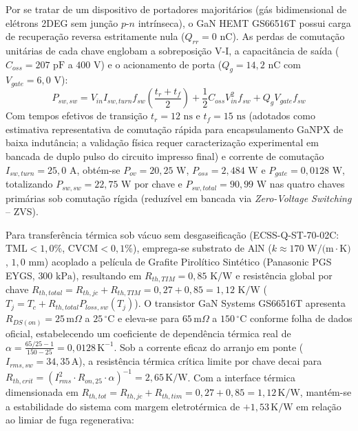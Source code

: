Por se tratar de um dispositivo de portadores majoritários (gás bidimensional de elétrons 2DEG sem junção $p\text{-}n$ intrínseca), o GaN HEMT GS66516T possui carga de recuperação reversa estritamente nula ($Q_{rr} = 0\text{ nC}$). As perdas de comutação unitárias de cada chave englobam a sobreposição V-I, a capacitância de saída ($C_{oss} = 207\text{ pF}$ a $400\text{ V}$) e o acionamento de porta ($Q_g = 14{,}2\text{ nC}$ com $V_{gate} = 6{,}0\text{ V}$):
\begin{equation}
    P_{sw,sw} = V_{in} I_{sw,turn} f_{sw} \left( \frac{t_r + t_f}{2} \right) + \frac{1}{2} C_{oss} V_{in}^2 f_{sw} + Q_g V_{gate} f_{sw}
    \label{eq:psw_sw}
\end{equation}
Com tempos efetivos de transição $t_r = 12\text{ ns}$ e $t_f = 15\text{ ns}$ (adotados como estimativa representativa de comutação rápida para encapsulamento GaNPX de baixa indutância; a validação física requer caracterização experimental em bancada de duplo pulso do circuito impresso final) e corrente de comutação $I_{sw,turn} = 25{,}0\text{ A}$, obtém-se $P_{ov} = 20{,}25\text{ W}$, $P_{oss} = 2{,}484\text{ W}$ e $P_{gate} = 0{,}0128\text{ W}$, totalizando $P_{sw,sw} = 22{,}75\text{ W}$ por chave e $P_{sw,total} = 90{,}99\text{ W}$ nas quatro chaves primárias sob comutação rígida (reduzível em bancada via \textit{Zero-Voltage Switching} -- ZVS).

Para transferência térmica sob vácuo sem desgaseificação (ECSS-Q-ST-70-02C: $\text{TML} < 1{,}0\%$, $\text{CVCM} < 0{,}1\%$), emprega-se substrato de $\text{AlN}$ ($k \approx 170\text{ W/(m}\cdot\text{K)}$, $1{,}0\text{ mm}$) acoplado a película de Grafite Pirolítico Sintético (Panasonic PGS EYGS, $300\text{ kPa}$), resultando em $R_{th,TIM} = 0{,}85\text{ K/W}$ e resistência global por chave $R_{th,total} = R_{th,jc} + R_{th,TIM} = 0{,}27 + 0{,}85 = 1{,}12\text{ K/W}$ ($T_j = T_c + R_{th,total} P_{loss,sw}(T_j)$). O transistor GaN Systems GS66516T apresenta $R_{DS(on)} = 25\,\mathrm{m}\Omega$ a $25\,^\circ\mathrm{C}$ e eleva-se para $65\,\mathrm{m}\Omega$ a $150\,^\circ\mathrm{C}$ conforme folha de dados oficial, estabelecendo um coeficiente de dependência térmica real de $\alpha = \frac{65/25 - 1}{150 - 25} = 0{,}0128\,\mathrm{K^{-1}}$. Sob a corrente eficaz do arranjo em ponte ($I_{rms,sw} = 34{,}35\,\mathrm{A}$), a resistência térmica crítica limite por chave decai para $R_{th,crit} = (I_{rms}^2 \cdot R_{on,25} \cdot \alpha)^{-1} = 2{,}65\,\mathrm{K/W}$. Com a interface térmica dimensionada em $R_{th,tot} = R_{th,jc} + R_{th,tim} = 0{,}27 + 0{,}85 = 1{,}12\,\mathrm{K/W}$, mantém-se a estabilidade do sistema com margem eletrotérmica de $+1{,}53\,\mathrm{K/W}$ em relação ao limiar de fuga regenerativa:

